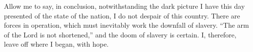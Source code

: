 \documentclass[a4paper,12pt]{article}
\begin{document}
\begin{linenumbers}
 Allow me to say, in conclusion, notwithstanding the dark picture I have this day presented of the state of the nation, I do not despair of this country. There are forces in operation, which must inevitably work the downfall of slavery. “The arm of the Lord is not shortened,” and the doom of slavery is certain. I, therefore, leave off where I began, with hope.
\end{linenumbers}
\end{document}
